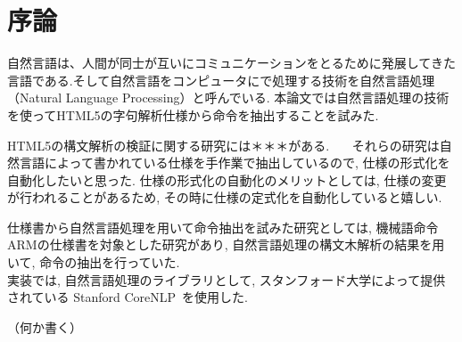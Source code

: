 \documentclass[uplatex,a4j]{jsreport}
\begin{document}
\chapter{序論}

自然言語は、人間が同士が互いにコミュニケーションをとるために発展してきた言語である.そして自然言語をコンピュータにで処理する技術を自然言語処理（Natural Language Processing）と呼んでいる.
本論文では自然言語処理の技術を使ってHTML5の字句解析仕様から命令を抽出することを試みた.

HTML5の構文解析の検証に関する研究には＊＊＊がある. ~\cite{XSSAuditor}~\cite{トランスデューサの包含関係}~\cite{HTML5Testing}それらの研究は自然言語によって書かれている仕様を手作業で抽出しているので, 仕様の形式化を自動化したいと思った. 
仕様の形式化の自動化のメリットとしては, 仕様の変更が行われることがあるため, その時に仕様の定式化を自動化していると嬉しい.


仕様書から自然言語処理を用いて命令抽出を試みた研究としては, 機械語命令ARMの仕様書を対象とした研究があり, 
自然言語処理の構文木解析の結果を用いて, 命令の抽出を行っていた.~\cite{arm}\\

実装では, 自然言語処理のライブラリとして, スタンフォード大学によって提供されている Stanford CoreNLP~\cite{manning-EtAl:2014:P14-5}を使用した.


（何か書く）
\end{document}
